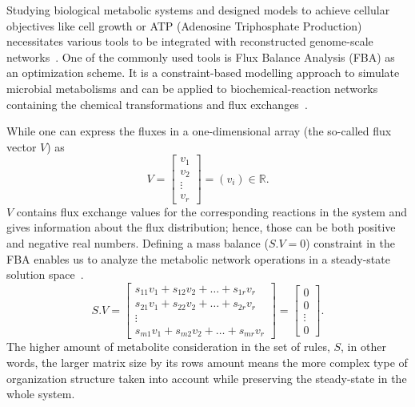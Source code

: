 Studying biological metabolic systems and designed models to achieve cellular objectives like cell growth or ATP (Adenosine Triphosphate Production) necessitates various tools to be integrated with reconstructed genome-scale networks~\cite{KIM, HAO}. One of the commonly used tools is Flux Balance Analysis (FBA) as an optimization scheme. It is a constraint-based modelling approach to simulate microbial metabolisms and can be applied to biochemical-reaction networks containing the chemical transformations and flux exchanges~\cite{KAUFFMAN2003491, PRICE2004}.

While one can express the fluxes in a one-dimensional array (the so-called flux vector $V$) as 
\begin{equation} \tag{2}
	V = \begin{bmatrix}
		v_{1} \\
		v_{2} \\
		\vdots \\
		v_{r}
	\end{bmatrix}=(v_{i})\in \mathbb{R}.
	\label{solutionvector}
\end{equation}
$V$ contains flux exchange values for the corresponding reactions in the system and gives information about the flux distribution; hence, those can be both positive and negative real numbers. Defining a mass balance ($S.V=0$) constraint in the FBA enables us to analyze the metabolic network operations in a steady-state solution space~\cite{KAUFFMAN2003491,PRICE2004}.
\begin{equation} \tag{3}
	S.V = \begin{bmatrix} 
		s_{11}v_{1} + s_{12}v_{2} + \dots + s_{1r}v_{r} \\
		s_{21}v_{1} + s_{22}v_{2} + \dots + s_{2r}v_{r} \\
		\vdots \\
		s_{m1}v_{1} + s_{m2}v_{2} + \dots + s_{mr}v_{r} 
	\end{bmatrix}=
	\begin{bmatrix} 
		0 \\
		0 \\
		\vdots \\
		0
	\end{bmatrix}.
	\label{massbalanceconstraint}
\end{equation}
The higher amount of metabolite consideration in the set of rules, $S$, in other words, the larger matrix size by its rows amount means the more complex type of organization structure taken into account while preserving the steady-state in the whole system.

